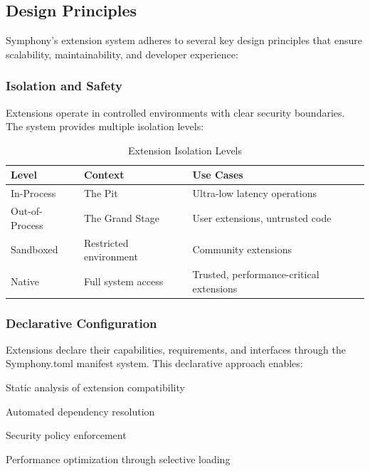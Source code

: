 \subsection{Design Principles}
\label{subsec:design-principles}

Symphony's extension system adheres to several key design principles that ensure scalability, maintainability, and developer experience:

\subsubsection{Isolation and Safety}
\label{subsubsec:isolation-safety}

Extensions operate in controlled environments with clear security boundaries. The system provides multiple isolation levels:

\begin{table}[h]
\centering
\caption{Extension Isolation Levels}
\label{tab:isolation-levels}
\begin{tabular}{@{}lll@{}}
\toprule
\textbf{Level} & \textbf{Context} & \textbf{Use Cases} \\
\midrule
In-Process & The Pit & Ultra-low latency operations \\
Out-of-Process & The Grand Stage & User extensions, untrusted code \\
Sandboxed & Restricted environment & Community extensions \\
Native & Full system access & Trusted, performance-critical extensions \\
\bottomrule
\end{tabular}
\end{table}

\subsubsection{Declarative Configuration}
\label{subsubsec:declarative-configuration}

Extensions declare their capabilities, requirements, and interfaces through the Symphony.toml manifest system. This declarative approach enables:

\begin{compactlist}
\item Static analysis of extension compatibility
\item Automated dependency resolution
\item Security policy enforcement
\item Performance optimization through selective loading
\end{compactlist}

